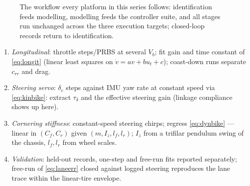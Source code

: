 \documentclass[conference]{IEEEtran}
\begin{document}
\begin{figure}[!t]
\centering
{}
\caption{The workflow every platform in this series follows: identification feeds modelling, modelling feeds the controller suite, and all stages run unchanged across the three execution targets; closed-loop records return to identification.}
\label{fig:workflow}
\end{figure}
\begin{enumerate}[label=E\arabic*)]
\item \emph{Longitudinal}: throttle steps/PRBS at several $V_b$; fit gain and time constant of \eqref{eq:longit} (linear least squares on $\dot v = a v + b u_t + c$); coast-down runs separate $c_{rr}$ and drag.
\item \emph{Steering servo}: $\delta_c$ steps against IMU yaw rate at constant speed via \eqref{eq:kinbike}: extract $\tau_\delta$ and the effective steering gain (linkage compliance shows up here).
\item \emph{Cornering stiffness}: constant-speed steering chirps; regress \eqref{eq:dynbike} --- linear in $(C_f, C_r)$ given $(m, I_z, l_f, l_r)$; $I_z$ from a trifilar pendulum swing of the chassis, $l_f, l_r$ from wheel scales.
\item \emph{Validation}: held-out records, one-step and free-run fits reported separately; free-run of \eqref{eq:laneerr} closed against logged steering reproduces the lane trace within the linear-tire envelope.
\end{enumerate}
\end{document}
